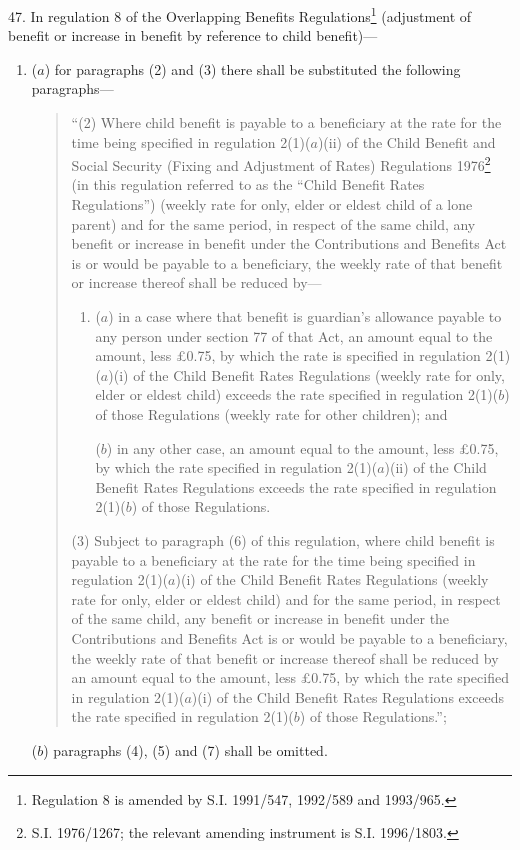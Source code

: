 \documentclass[12pt,a4paper]{article}
\begin{document}
47.  In regulation 8 of the Overlapping Benefits Regulations\footnote{\frenchspacing Regulation 8 is amended by S.I. 1991/547, 1992/589 and 1993/965.} (adjustment of benefit or increase in benefit by reference to child benefit)—
\begin{enumerate}\item[]
($a$) for paragraphs (2) and (3) there shall be substituted the following paragraphs—
\begin{quotation}
“(2) Where child benefit is payable to a beneficiary at the rate for the time being specified in regulation 2(1)($a$)(ii) of the Child Benefit and Social Security (Fixing and Adjustment of Rates) Regulations 1976\footnote{\frenchspacing S.I. 1976/1267; the relevant amending instrument is S.I. 1996/1803.} (in this regulation referred to as the “Child Benefit Rates Regulations”) (weekly rate for only, elder or eldest child of a lone parent) and for the same period, in respect of the same child, any benefit or increase in benefit under the Contributions and Benefits Act is or would be payable to a beneficiary, the weekly rate of that benefit or increase thereof shall be reduced by—
\begin{enumerate}\item[]
($a$) in a case where that benefit is guardian’s allowance payable to any person under section 77 of that Act, an amount equal to the amount, less £0.75, by which the rate is specified in regulation 2(1)($a$)(i) of the Child Benefit Rates Regulations (weekly rate for only, elder or eldest child) exceeds the rate specified in regulation 2(1)($b$) of those Regulations (weekly rate for other children); and

($b$) in any other case, an amount equal to the amount, less £0.75, by which the rate specified in regulation 2(1)($a$)(ii) of the Child Benefit Rates Regulations exceeds the rate specified in regulation 2(1)($b$) of those Regulations.
\end{enumerate}

(3) Subject to paragraph (6) of this regulation, where child benefit is payable to a beneficiary at the rate for the time being specified in regulation 2(1)($a$)(i) of the Child Benefit Rates Regulations (weekly rate for only, elder or eldest child) and for the same period, in respect of the same child, any benefit or increase in benefit under the Contributions and Benefits Act is or would be payable to a beneficiary, the weekly rate of that benefit or increase thereof shall be reduced by an amount equal to the amount, less £0.75, by which the rate specified in regulation 2(1)($a$)(i) of the Child Benefit Rates Regulations exceeds the rate specified in regulation 2(1)($b$) of those Regulations.”;
\end{quotation}

($b$) paragraphs (4), (5) and (7) shall be omitted.
\end{enumerate}
\end{document}
